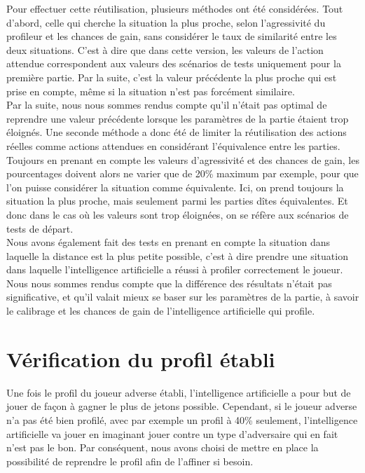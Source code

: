 \documentclass{report}
\begin{document}
Pour effectuer cette réutilisation, plusieurs méthodes ont été considérées. Tout d'abord, celle qui cherche la situation la plus proche, selon l'agressivité du profileur et les chances de gain, sans considérer le taux de similarité entre les deux situations. C'est à dire que dans cette version, les valeurs de l'action attendue correspondent aux valeurs des scénarios de tests uniquement pour la première partie. Par la suite, c'est la valeur précédente la plus proche qui est prise en compte, même si la situation n'est pas forcément similaire.\\

Par la suite, nous nous sommes rendus compte qu'il n'était pas optimal de reprendre une valeur précédente lorsque les paramètres de la partie étaient trop éloignés. Une seconde méthode a donc été de limiter la réutilisation des actions réelles comme actions attendues en considérant l'équivalence entre les parties. Toujours en prenant en compte les valeurs d'agressivité et des chances de gain, les pourcentages doivent alors ne varier que de 20\% maximum par exemple, pour que l'on puisse considérer la situation comme équivalente. Ici, on prend toujours la situation la plus proche, mais seulement parmi les parties dîtes équivalentes. Et donc dans le cas où les valeurs sont trop éloignées, on se réfère aux scénarios de tests de départ.\\

Nous avons également fait des tests en prenant en compte la situation dans laquelle la distance est la plus petite possible, c'est à dire prendre une situation dans laquelle l'intelligence artificielle a réussi à profiler correctement le joueur. Nous nous sommes rendus compte que la différence des résultats n'était pas significative, et qu'il valait mieux se baser sur les paramètres de la partie, à savoir le calibrage et les chances de gain de l'intelligence artificielle qui profile.\\

\section{Vérification du profil établi}

\hspace{0.5cm}Une fois le profil du joueur adverse établi, l'intelligence artificielle a pour but de jouer de façon à gagner le plus de jetons possible. Cependant, si le joueur adverse n'a pas été bien profilé, avec par exemple un profil à 40\% seulement, l'intelligence artificielle va jouer en imaginant jouer contre un type d'adversaire qui en fait n'est pas le bon. Par conséquent, nous avons choisi de mettre en place la possibilité de reprendre le profil afin de l’affiner si besoin. \\
\end{document}
